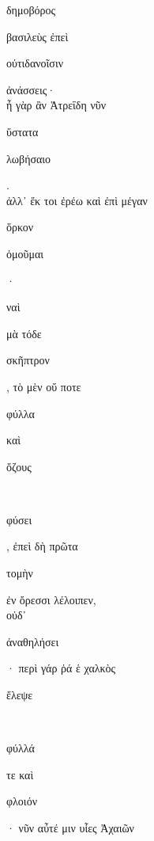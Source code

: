 \documentclass{ransom}
\begin{document}
\renewcommand{\rightheaderwhat}{\rightheaderwhatglosses}%
\begin{foreignpage}
\begin{graytext}
\begin{whitetext}δημοβόρος\end{whitetext} βασιλεὺς ἐπεὶ \begin{whitetext}οὐτιδανοῖσιν\end{whitetext} ἀνάσσεις·\\
ἦ γὰρ ἂν Ἀτρεΐδη νῦν \begin{whitetext}ὕστατα\end{whitetext} \begin{whitetext}λωβήσαιο\end{whitetext}.\\
ἀλλ᾽ ἔκ τοι ἐρέω καὶ ἐπὶ μέγαν \begin{whitetext}ὅρκον\end{whitetext} \begin{whitetext}ὀμοῦμαι\end{whitetext}·\\
\begin{whitetext}ναὶ\end{whitetext} μὰ τόδε \begin{whitetext}σκῆπτρον\end{whitetext}, τὸ μὲν οὔ ποτε \begin{whitetext}φύλλα\end{whitetext} καὶ \begin{whitetext}ὄζους\end{whitetext}\\
\begin{whitetext}φύσει\end{whitetext}, ἐπεὶ δὴ πρῶτα \begin{whitetext}τομὴν\end{whitetext} ἐν ὄρεσσι λέλοιπεν,\hfill{}\\
οὐδ᾽ \begin{whitetext}ἀναθηλήσει\end{whitetext}· περὶ γάρ ῥά ἑ χαλκὸς \begin{whitetext}ἔλεψε\end{whitetext}\\
\begin{whitetext}φύλλά\end{whitetext} τε καὶ \begin{whitetext}φλοιόν\end{whitetext}· νῦν αὖτέ μιν υἷες Ἀχαιῶν\\

\end{graytext}
\end{foreignpage}
\end{document}
